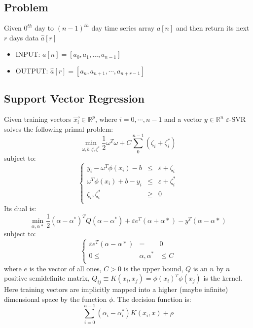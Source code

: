 \documentclass[a0b,portrait]{a0poster}
\begin{document}
\begin{multicols}{3}
\subsection*{Problem}
Given $0^{th}$ day to $\left(n - 1\right)^{th}$ day time series array $a\left[n\right]$ and then return its next $r$ days data $\hat{a}\left[r\right]$
\begin{itemize}
\item INPUT: $a\left[n\right] = \left[a_0, a_1, …, a_{n - 1}\right]$
\item OUTPUT: $\hat{a}\left[r\right] = \left[a_{n}, a_{n + 1}, \cdots, a_{n + r - 1}\right]$
\end{itemize}
\subsection*{Support Vector Regression}
Given training vectors $\vec{x_i} \in \mathbb{R}^p$, where $i = 0, \cdots, n - 1$ and a vector $y \in \mathbb{R}^n$ $\varepsilon$-SVR solves the following primal problem:
\begin{equation}
\min\limits_{\omega, b, \zeta, \zeta^*}\dfrac{1}{2}\omega^T\omega + C \sum \limits_{0}^{n - 1}{\left(\zeta_i + \zeta_i^*\right)}
\end{equation}
subject to:
\begin{equation}
\left\{
\begin{array}{rcl}
y_i - \omega^T\phi\left(x_i\right) - b & \le & \varepsilon + \zeta_i\\
\omega^T\phi\left(x_i\right) + b - y_i & \le & \varepsilon + \zeta_i^*\\
\zeta_i, \zeta_i^* & \ge & 0\\
\end{array}
\right.
\end{equation}
Its dual is:
\begin{equation}
\min\limits_{\alpha, \alpha*}\dfrac{1}{2}\left(\alpha - \alpha^*\right)^T Q\left(\alpha - \alpha^*\right) + \varepsilon e^T \left(\alpha + \alpha*\right) - y ^ T \left(\alpha - \alpha*\right)
\end{equation}
subject to:
\begin{equation}
\left\{
\begin{array}{rcl}
\varepsilon e^T \left(\alpha - \alpha*\right) & = & 0\\
0 \le & \alpha, \alpha^* & \le C\\
\end{array}
\right.
\end{equation}
where $e$ is the vector of all ones, $C > 0$ is the upper bound, $Q$ is an $n$ by $n$ positive semidefinite matrix,
$Q_{ij} \equiv K\left(x_i, x_j\right) = \phi \left(x_i\right)^T \phi \left(x_j\right)$ is the kernel. Here training vectors are implicitly mapped into a higher (maybe infinite) dimensional space by the function $\phi$.
The decision function is:
\begin{equation}
\sum_{i=0}^{n-1} \left(\alpha_i - \alpha_i^*\right) K\left(x_i, x\right) + \rho
\end{equation}

\end{multicols}
\end{document}
